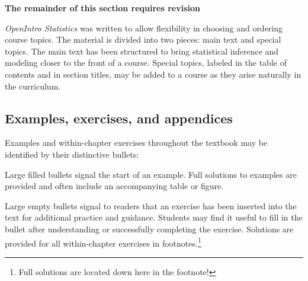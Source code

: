 \begin{doublespace}
\textbf{The remainder of this section requires revision}


\emph{OpenIntro Statistics} was written to allow flexibility in choosing and ordering course topics. The material is divided into two pieces: main text and special topics. The main text has been structured to bring statistical inference and modeling closer to the front of a course. Special topics, labeled in the table of contents and in section titles, may be added to a course as they arise naturally in the curriculum.


\subsection*{Examples, exercises, and appendices}

Examples and within-chapter exercises throughout the textbook may be identified by their distinctive bullets:

\begin{example}{Large filled bullets signal the start of an example.}
Full solutions to examples are provided and often include an accompanying table or figure.
 \end{example}

\begin{exercise}
Large empty bullets signal to readers that an exercise has been inserted into the text for additional practice and guidance. Students may find it useful to fill in the bullet after understanding or successfully completing the exercise. Solutions are provided for all within-chapter exercises in footnotes.\footnote{Full solutions are located down here in the footnote!}
\end{exercise}


\end{doublespace}
